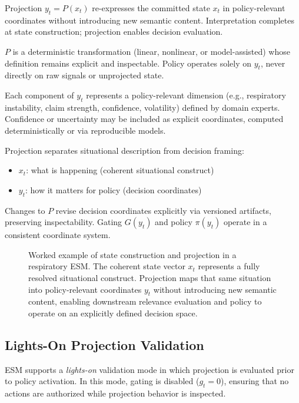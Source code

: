 \documentclass[11pt]{article}
\begin{document}
Projection $y_t = P(x_t)$ re-expresses the committed state $x_t$ in policy-relevant coordinates without introducing new semantic content. Interpretation completes at state construction; projection enables decision evaluation.

$P$ is a deterministic transformation (linear, nonlinear, or model-assisted) whose definition remains explicit and inspectable. Policy operates solely on $y_t$, never directly on raw signals or unprojected state.

Each component of $y_t$ represents a policy-relevant dimension (e.g., respiratory instability, claim strength, confidence, volatility) defined by domain experts. Confidence or uncertainty may be included as explicit coordinates, computed deterministically or via reproducible models.

Projection separates situational description from decision framing:
\begin{itemize}
    \item $x_t$: what is happening (coherent situational construct)
    \item $y_t$: how it matters for policy (decision coordinates)
\end{itemize}

Changes to $P$ revise decision coordinates explicitly via versioned artifacts, preserving inspectability. Gating $G(y_t)$ and policy $\pi(y_t)$ operate in a consistent coordinate system.

\begin{figure}[H]
\centering

\caption{Worked example of state construction and projection in a respiratory ESM. The coherent state vector $x_t$ represents a fully resolved situational construct. Projection maps that same situation into policy-relevant coordinates $y_t$ without introducing new semantic content, enabling downstream relevance evaluation and policy to operate on an explicitly defined decision space.}
\label{fig:state-projection-example}
\end{figure}

\subsection{Lights-On Projection Validation}

ESM supports a \emph{lights-on} validation mode in which projection is evaluated prior to policy activation. In this mode, gating is disabled ($g_t = 0$), ensuring that no actions are authorized while projection behavior is inspected.
\end{document}
